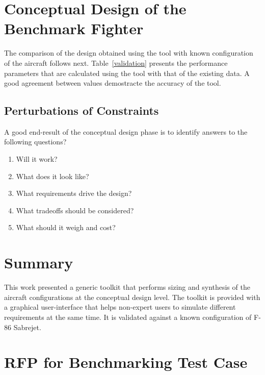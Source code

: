 \documentclass[pdftex,11pt,letter]{article}
\begin{document}
\section{Conceptual Design of the Benchmark Fighter}
The comparison of the design obtained using the tool with known configuration of the aircraft follows next. Table~\ref{validation} presents the performance parameters that are calculated using the tool with that of the existing data\cite{}. A good agreement between values demostracte the accuracy of the tool.

\subsection{Perturbations of Constraints}

A good end-result of the conceptual design phase is to identify answers to the following questions? 
\begin{enumerate}
\item Will it work?
\item What does it look like?
\item What requirements drive the design?
\item What tradeoffs should be considered?
\item What should it weigh and cost?
\end{enumerate}


\section{Summary}\label{conclusion}

This work presented a generic toolkit that performs sizing and synthesis of the aircraft configurations at the conceptual design level. The toolkit is provided with a graphical user-interface that helps non-expert users to simulate different requirements at the same time. It is validated against a known configuration of F-86 Sabrejet. 


	

\appendix
\section{RFP for Benchmarking Test Case}\label{rfpbench}
\end{document}

